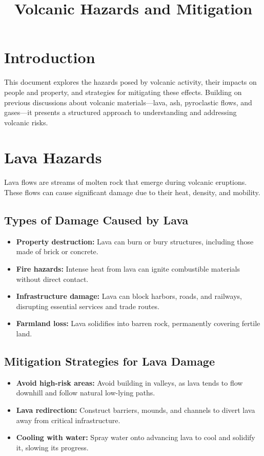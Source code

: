 \documentclass{article}
\begin{document}
\title{Volcanic Hazards and Mitigation}
\author{}
\date{}

\maketitle

\section{Introduction}
This document explores the hazards posed by volcanic activity, their impacts on people and property, and strategies for mitigating these effects. Building on previous discussions about volcanic materials—lava, ash, pyroclastic flows, and gases—it presents a structured approach to understanding and addressing volcanic risks.

\section{Lava Hazards}
Lava flows are streams of molten rock that emerge during volcanic eruptions. These flows can cause significant damage due to their heat, density, and mobility.

\subsection{Types of Damage Caused by Lava}
\begin{itemize}
    \item \textbf{Property destruction:} Lava can burn or bury structures, including those made of brick or concrete.
    \item \textbf{Fire hazards:} Intense heat from lava can ignite combustible materials without direct contact.
    \item \textbf{Infrastructure damage:} Lava can block harbors, roads, and railways, disrupting essential services and trade routes.
    \item \textbf{Farmland loss:} Lava solidifies into barren rock, permanently covering fertile land.
\end{itemize}

\subsection{Mitigation Strategies for Lava Damage}
\begin{itemize}
    \item \textbf{Avoid high-risk areas:} Avoid building in valleys, as lava tends to flow downhill and follow natural low-lying paths.
    \item \textbf{Lava redirection:} Construct barriers, mounds, and channels to divert lava away from critical infrastructure.
    \item \textbf{Cooling with water:} Spray water onto advancing lava to cool and solidify it, slowing its progress.
\end{itemize}
\end{document}
